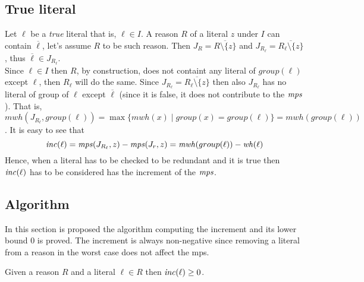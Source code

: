 \subsection{True literal}
Let $\ell$ be a \textit{true} literal that is,
$\ell \in I$. 
A reason $R$ of a literal $z$ under $I$ can contain $\overline{\ell}$, let's assume $R$ to be 
such reason.
Then  $J_R = \overline{R \setminus \{z\}}$ and $J_{R_{\ell}} = \overline{R_{\ell} \setminus \{z\}}$, thus
$\overline{\ell} \in J_{R_{\ell}}$.\\ 
Since $\ell \in I$ then $R$, by construction, does not containt any literal of $group(\ell)$ 
except $\ell$, then $R_{\ell}$ will do the same.
Since $J_{R_{\ell}} = \overline{R_{\ell} \setminus \{z\}}$ then also $J_{R_{\ell}}$ 
has no literal of group of $\ell$
except $\overline{\ell}$ (since it is false, it does not contribute to the $\mathit{mps}$).
That is, $\mathit{mwh}(J_{R_{\ell}},group(\ell))= \max\{ \mathit{mwh}(x) \mid \mathit{group}(x) = group(\ell) \} 
= \mathit{mwh}(group(\ell))$.
It is easy to see that
$$\mathit{inc}(\ell) = \mathit{mps}(J_{R_{\ell}},z)-\mathit{mps}(J_r,z) = \mathit{mwh}(group(\ell)) - \mathit{wh}(\ell)$$
Hence, when a literal has to be checked to be redundant and it is true then 
$\mathit{inc}(\ell)$ has to be considered has the increment of the $\mathit{mps}$.

\subsection{Algorithm}
In this section is proposed the algorithm computing the increment and its lower bound 0 is proved.
The increment is always non-negative since removing a literal from a reason 
in the worst case does not affect the mps.

\begin{theorem}
    \label{theorem:inc}
    Given a reason $R$ and a literal $\ell \in R$ then $\mathit{inc}(\ell) \ge 0$.
\end{theorem}

